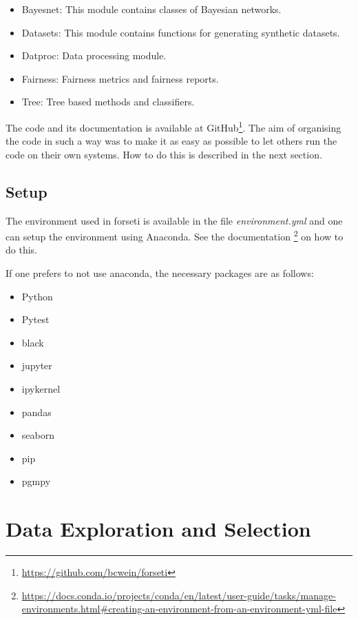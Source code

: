 \begin{itemize}
    \item Bayesnet: This module contains classes of Bayesian networks.
    \item Datasets: This module contains functions for generating synthetic datasets.
    \item Datproc: Data processing module.
    \item Fairness: Fairness metrics and fairness reports.
    \item Tree: Tree based methods and classifiers.
\end{itemize}

The code and its documentation is available at GitHub\footnote{\url{https://github.com/bcwein/forseti}}. The aim of organising the code in such a way was to make it as easy as possible to let others run the code on their own systems. How to do this is described in the next section.

\subsection{Setup}

The environment used in forseti is available in the file \emph{environment.yml} and one can setup the environment using Anaconda. See the documentation \footnote{\url{https://docs.conda.io/projects/conda/en/latest/user-guide/tasks/manage-environments.html\#creating-an-environment-from-an-environment-yml-file}} on how to do this.

If one prefers to not use anaconda, the necessary packages are as follows:

\begin{itemize}
    \item Python
    \item Pytest
    \item black
    \item jupyter
    \item ipykernel
    \item pandas
    \item seaborn
    \item pip
    \item pgmpy
\end{itemize}

\section{Data Exploration and Selection}

